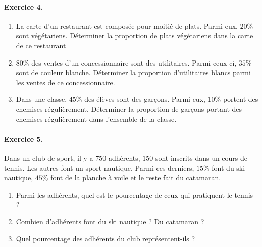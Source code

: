 \documentclass[11pt]{article}
\begin{document}
\paragraph{Exercice 4.}
\begin{enumerate}
  \item La carte d’un restaurant est composée pour moitié de plats. Parmi eux,
    $20\%$ sont végétariens. Déterminer la proportion de plats végétariens dans la carte de ce restaurant
  \item $80\%$ des ventes d’un concessionnaire sont des utilitaires. Parmi
    ceux-ci, $35\%$ sont de couleur blanche. Déterminer la proportion d’utilitaires blancs parmi les ventes de ce concessionnaire.
  \item Dans une classe, $45\%$ des élèves sont des garçons. Parmi eux, $10\%$
    portent des chemises régulièrement. Déterminer la proportion de garçons
    portant des chemises régulièrement dans l’ensemble de la classe.
\end{enumerate}

\paragraph{Exercice 5.} Dans un club de sport, il y a $750$ adhérents, $150$
sont inscrits dans un cours de tennis. Les autres font un sport nautique. Parmi
ces derniers, $15\%$ font du ski nautique, $45\%$ font de la planche à voile et le reste fait du catamaran.
\begin{enumerate}
  \item Parmi les adhérents, quel est le pourcentage de ceux qui pratiquent le tennis ?
  \item Combien d’adhérents font du ski nautique ? Du catamaran ?
  \item Quel pourcentage des adhérents du club représentent-ils ?
\end{enumerate}
\end{document}
